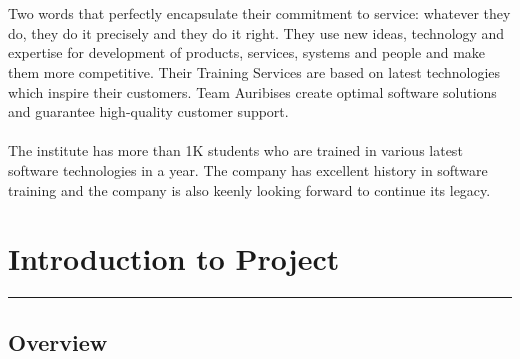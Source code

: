 \\
\\
Two words that perfectly encapsulate their commitment to service: whatever they do, they do it precisely and they do it right. They use new ideas, technology and expertise for development of products, services, systems and people and make them more competitive. Their Training Services are based on latest technologies which inspire their customers. Team Auribises create optimal software solutions and guarantee high-quality customer support.
\\
\\
The institute has more than 1K students who are trained in various latest software technologies in a year. The company has excellent history in software training and the company is also keenly looking forward to continue its legacy.

\chapter{Introduction to Project}\hrule
\label{Chapter:2}
\section{Overview}

